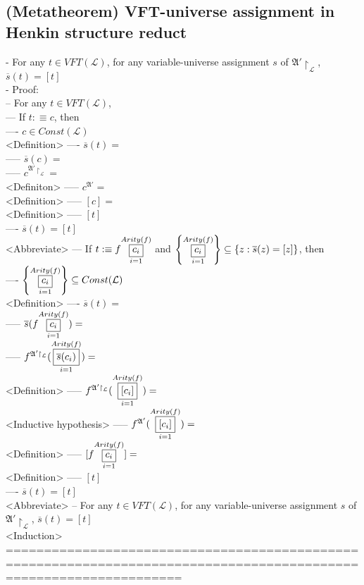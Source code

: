 \documentclass{book}
\newcommand{\is}{:\equiv}
\newcommand{\means}[2]{#1^{#2}}
\newcommand{\extend}[1]{\overline{#1}}
\newcommand{\set}[1]{\left\{ #1 \right\}}
\newcommand{\vdc}[3]{\underset{#2}{\overset{#3}{\fbox{$#1$}}}}
\begin{document}
\subsection{(Metatheorem) VFT-universe assignment in Henkin structure reduct} %
	- For any $t \in VFT(\mathcal{L})$, for any variable-universe assignment $s$ of $\mathfrak{A}' \upharpoonright_\mathcal{L}$, $\extend{s}(t) = [t]$ \\
	- Proof: \\
		-- For any $t \in VFT(\mathcal{L})$, \\
			--- If $t \is c$, then \\
				---- $c \in Const(\mathcal{L})$ \\ <Definition>
				---- $\extend{s}(t) = $ \\
					----- $\extend{s}(c) = $ \\
					----- $\means{c}{\mathfrak{A}' \upharpoonright_\mathcal{L}} = $ \\ <Definiton>
					----- $\means{c}{\mathfrak{A}'} = $ \\ <Definition>
					----- $[c] = $ \\ <Definition>
					----- $[t]$ \\
				---- $\extend{s}(t) = [t]$ \\ <Abbreviate>
			--- If $t \is f \vdc{c_i}{i=1}{Arity(f)}$ and $\set{\vdc{c_i}{i=1}{Arity(f)}} \subseteq \set{z: \extend{s}(z) = [z]}$, then \\
				---- $\set{\vdc{c_i}{i=1}{Arity(f)}} \subseteq Const(\mathcal{L})$ \\ <Definition>
				---- $\extend{s}(t) = $ \\
					----- $\extend{s}(f \vdc{c_i}{i=1}{Arity(f)}) = $ \\
					----- $\means{f}{\mathfrak{A}' \upharpoonright_\mathcal{L}}(\vdc{\extend{s}(c_i)}{i=1}{Arity(f)}) = $ \\ <Definition>
					----- $\means{f}{\mathfrak{A}' \upharpoonright_\mathcal{L}}(\vdc{[c_i]}{i=1}{Arity(f)}) = $ \\ <Inductive hypothesis>
					----- $\means{f}{\mathfrak{A}'}(\vdc{[c_i]}{i=1}{Arity(f)}) = $ \\ <Definition>
					----- $[f \vdc{c_i}{i=1}{Arity(f)}] = $ \\ <Definition>
					----- $[t]$ \\
				---- $\extend{s}(t) = [t]$ \\ <Abbreviate>
		-- For any $t \in VFT(\mathcal{L})$, for any variable-universe assignment $s$ of $\mathfrak{A}' \upharpoonright_\mathcal{L}$, $\extend{s}(t) = [t]$ \\ <Induction>
	===================================================================================================================
\end{document}
